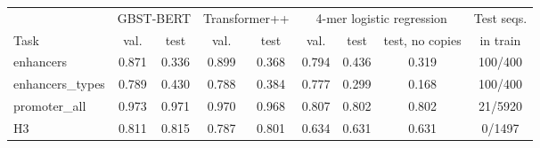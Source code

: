 \begin{tabular}{lcccccccc}
\toprule
& \multicolumn{2}{c}{GBST-BERT} & \multicolumn{2}{c}{Transformer++} & \multicolumn{3}{c}{4-mer logistic regression} & Test seqs. \\
\cmidrule(lr){2-3}\cmidrule(lr){4-5}\cmidrule(lr){6-8}
Task & val. & test & val. & test & val. & test & test, no copies & in train \\
\midrule
enhancers & 0.871 & 0.336 & 0.899 & 0.368 & 0.794 & 0.436 & 0.319 & 100/400 \\
enhancers\_types & 0.789 & 0.430 & 0.788 & 0.384 & 0.777 & 0.299 & 0.168 & 100/400 \\
promoter\_all & 0.973 & 0.971 & 0.970 & 0.968 & 0.807 & 0.802 & 0.802 & 21/5920 \\
H3 & 0.811 & 0.815 & 0.787 & 0.801 & 0.634 & 0.631 & 0.631 & 0/1497 \\
\bottomrule
\end{tabular}
